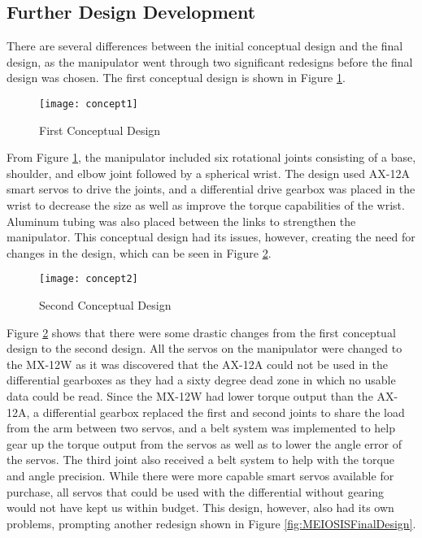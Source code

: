 \subsection{Further Design Development}
There are several differences between the initial conceptual design and the final design, as the manipulator went through two significant redesigns before the final design was chosen. The first conceptual design is shown in Figure \ref{fig:concept1}.

\begin{figure}[htp]
  \centering
  \texttt{[image: concept1]}
  \caption{First Conceptual Design}
  \label{fig:concept1}
\end{figure}

From Figure \ref{fig:concept1}, the manipulator included six rotational joints consisting of a base, shoulder, and elbow joint followed by a spherical wrist. The design used AX-12A smart servos to drive the joints, and a differential drive gearbox was placed in the wrist to decrease the size as well as improve the torque capabilities of the wrist. Aluminum tubing was also placed between the links to strengthen the manipulator. This conceptual design had its issues, however, creating the need for changes in the design, which can be seen in Figure \ref{fig:concept2}.

\begin{figure}[htp]
  \centering
  \texttt{[image: concept2]}
  \caption{Second Conceptual Design}
  \label{fig:concept2}
\end{figure}

Figure \ref{fig:concept2} shows that there were some drastic changes from the first conceptual design to the second design. All the servos on the manipulator were changed to the MX-12W as it was discovered that the AX-12A could not be used in the differential gearboxes as they had a sixty degree dead zone in which no usable data could be read. Since the MX-12W had lower torque output than the AX-12A, a differential gearbox replaced the first and second joints to share the load from the arm between two servos, and a belt system was implemented to help gear up the torque output from the servos as well as to lower the angle error of the servos. The third joint also received a belt system to help with the torque and angle precision. While there were more capable smart servos available for purchase, all servos that could be used with the differential without gearing would not have kept us within budget. This design, however, also had its own problems, prompting another redesign shown in Figure \ref{fig:MEIOSISFinalDesign}.

